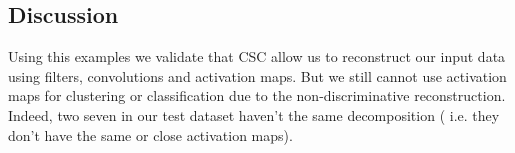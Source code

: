 \newpage
\subsection{Discussion}
Using this examples we validate that CSC allow us to reconstruct our input data using filters, convolutions and activation maps. But we still cannot use activation maps for clustering or classification due to the non-discriminative reconstruction. Indeed, two seven in our test dataset haven't the same decomposition ( i.e. they don't have the same or close activation maps).
